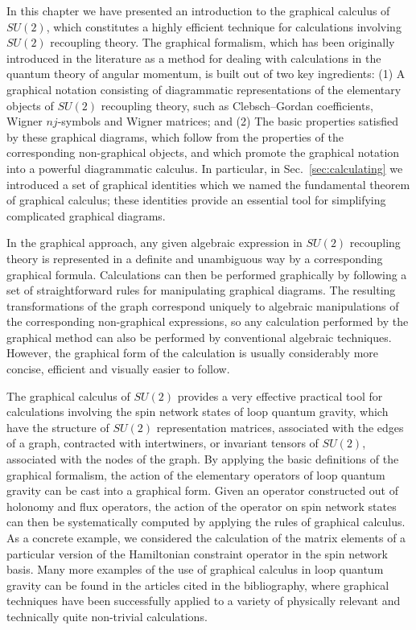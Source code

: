 \documentclass[graybox, secnum]{svmult}
\begin{document}
In this chapter we have presented an introduction to the graphical calculus of $SU(2)$, which constitutes a highly efficient technique for calculations involving $SU(2)$ recoupling theory. The graphical formalism, which has been originally introduced in the literature as a method for dealing with calculations in the quantum theory of angular momentum, is built out of two key ingredients: (1) A graphical notation consisting of diagrammatic representations of the elementary objects of $SU(2)$ recoupling theory, such as Clebsch--Gordan coefficients, Wigner $nj$-symbols and Wigner matrices; and (2) The basic properties satisfied by these graphical diagrams, which follow from the properties of the corresponding non-graphical objects, and which promote the graphical notation into a powerful diagrammatic calculus. In particular, in Sec.~\ref{sec:calculating} we introduced a set of graphical identities which we named the fundamental theorem of graphical calculus; these identities provide an essential tool for simplifying complicated graphical diagrams.

In the graphical approach, any given algebraic expression in $SU(2)$ recoupling theory is represented in a definite and unambiguous way by a corresponding graphical formula. Calculations can then be performed graphically by following a set of straightforward rules for manipulating graphical diagrams. The resulting transformations of the graph correspond uniquely to algebraic manipulations of the corresponding non-graphical expressions, so any calculation performed by the graphical method can also be performed by conventional algebraic techniques. However, the graphical form of the calculation is usually considerably more concise, efficient and visually easier to follow.

The graphical calculus of $SU(2)$ provides a very effective practical tool for calculations involving the spin network states of loop quantum gravity, which have the structure of $SU(2)$ representation matrices, associated with the edges of a graph, contracted with intertwiners, or invariant tensors of $SU(2)$, associated with the nodes of the graph. By applying the basic definitions of the graphical formalism, the action of the elementary operators of loop quantum gravity can be cast into a graphical form. Given an operator constructed out of holonomy and flux operators, the action of the operator on spin network states can then be systematically computed by applying the rules of graphical calculus. As a concrete example, we considered the calculation of the matrix elements of a particular version of the Hamiltonian constraint operator in the spin network basis. Many more examples of the use of graphical calculus in loop quantum gravity can be found in the articles cited in the bibliography, where graphical techniques have been successfully applied to a variety of physically relevant and technically quite non-trivial calculations.
\end{document}
